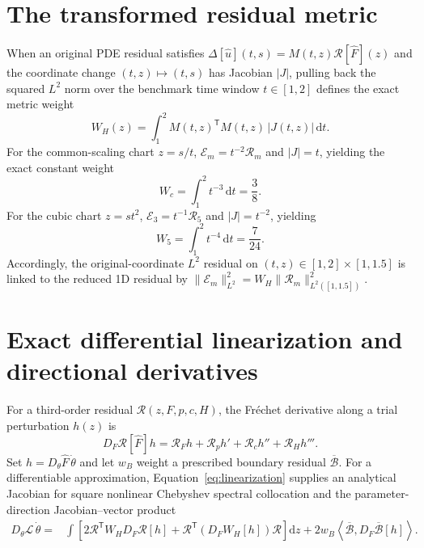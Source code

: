 \documentclass[11pt,a4paper,oneside]{report}
\numberwithin{equation}{chapter}
\newcommand{\E}{\mathcal E}
\newcommand{\R}{\mathcal R}
\newcommand{\dd}{\mathrm d}
\begin{document}
\section{The transformed residual metric}
When an original PDE residual satisfies $\Delta[\widehat u](t,s)=M(t,z)\R[\widehat F](z)$ and the coordinate change $(t,z)\mapsto(t,s)$ has Jacobian $|J|$, pulling back the squared $L^2$ norm over the benchmark time window $t\in[1,2]$ defines the exact metric weight
\begin{equation}\label{eq:metric}
W_H(z)=\int_{1}^{2}M(t,z)^{\mathsf T}M(t,z)\,|J(t,z)|\,\dd t.
\end{equation}
For the common-scaling chart $z=s/t$, $\E_m = t^{-2}\R_m$ and $|J|=t$, yielding the exact constant weight
\begin{equation}
W_c=\int_1^2 t^{-3}\,\dd t=\frac{3}{8}.
\end{equation}
For the cubic chart $z=st^2$, $\E_3 = t^{-1}\R_5$ and $|J|=t^{-2}$, yielding
\begin{equation}
W_5=\int_1^2 t^{-4}\,\dd t=\frac{7}{24}.
\end{equation}
Accordingly, the original-coordinate $L^2$ residual on $(t,z)\in[1,2]\times[1,1.5]$ is linked to the reduced 1D residual by $\|\E_m\|_{L^2}^2 = W_H \|\R_m\|_{L^2([1,1.5])}^2$.

\section{Exact differential linearization and directional derivatives}
For a third-order residual $\R(z,F,p,c,H)$, the Fr\'echet derivative along a trial perturbation $h(z)$ is
\begin{equation}\label{eq:linearization}
D_F\R[\widehat F]h=\R_Fh+\R_ph'+\R_ch''+\R_Hh'''.
\end{equation}
Set $h=D_\theta\widehat F\,\dot\theta$ and let $w_B$ weight a prescribed boundary residual $\overline{\mathcal B}$. For a differentiable approximation, Equation~\eqref{eq:linearization} supplies an analytical Jacobian for square nonlinear Chebyshev spectral collocation and the parameter-direction Jacobian--vector product
\begin{align}\label{eq:directionalloss}
D_\theta\mathcal L\,\dot\theta
={}&\int\left[2\R^{\mathsf T}W_H D_F\R[h]
 +\R^{\mathsf T}(D_FW_H[h])\R\right]\dd z
 +2w_B\left\langle\overline{\mathcal B},
 D_F\overline{\mathcal B}[h]\right\rangle.
\end{align}
\end{document}
